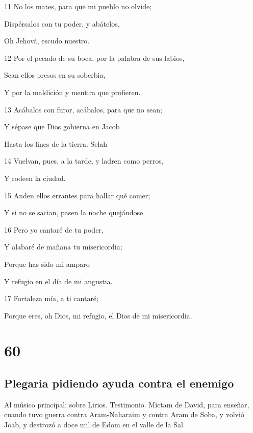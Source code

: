 \par 11 No los mates, para que mi pueblo no olvide;
\par Dispérsalos con tu poder, y abátelos,
\par Oh Jehová, escudo nuestro.
\par 12 Por el pecado de su boca, por la palabra de sus labios,
\par Sean ellos presos en su soberbia,
\par Y por la maldición y mentira que profieren.
\par 13 Acábalos con furor, acábalos, para que no sean;
\par Y sépase que Dios gobierna en Jacob
\par Hasta los fines de la tierra. Selah
\par 14 Vuelvan, pues, a la tarde, y ladren como perros,
\par Y rodeen la ciudad.
\par 15 Anden ellos errantes para hallar qué comer;
\par Y si no se sacian, pasen la noche quejándose.
\par 16 Pero yo cantaré de tu poder,
\par Y alabaré de mañana tu misericordia;
\par Porque has sido mi amparo
\par Y refugio en el día de mi angustia.
\par 17 Fortaleza mía, a ti cantaré;
\par Porque eres, oh Dios, mi refugio, el Dios de mi misericordia.

\chapter{60}

\section*{Plegaria pidiendo ayuda contra el enemigo}

\par Al músico principal; sobre Lirios. Testimonio. Mictam de David, para enseñar, cuando tuvo guerra contra Aram-Naharaim y contra Aram de Soba, y volvió Joab, y destrozó a doce mil de Edom en el valle de la Sal.

